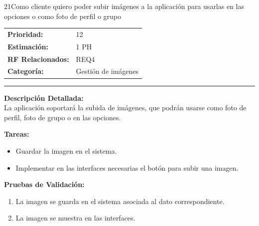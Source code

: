 \begin{hu_card}{21}{Como cliente quiero poder subir imágenes a la aplicación para usarlas en las opciones o como foto de perfil o grupo}
    \begin{tabularx}{\linewidth}{l X}
        \textbf{Prioridad:}   & 12\\
        \textbf{Estimación:}  & 1 PH \\
        \textbf{RF Relacionados:} & REQ4 \\
        \textbf{Categoría:} & Gestión de imágenes \\
    \end{tabularx}

    \vspace{2mm}
    \hrule
    \vspace{2mm}

    \textbf{Descripción Detallada:} \\
    La aplicación soportará la subida de imágenes, que podrán usarse como foto de perfil, foto de grupo o en las opciones.

    \vspace{2mm}
    \textbf{Tareas:}
    \begin{itemize}[noitemsep, topsep=0pt]
        \item Guardar la imagen en el sistema.
        \item Implementar en las interfaces necesarias el botón para subir una imagen.
    \end{itemize}

    \vspace{2mm}
    \textbf{Pruebas de Validación:}
    \begin{enumerate}[noitemsep, topsep=0pt]
        \item La imagen se guarda en el sistema asociada al dato correspondiente.
        \item La imagen se muestra en las interfaces.
    \end{enumerate}
\end{hu_card}

